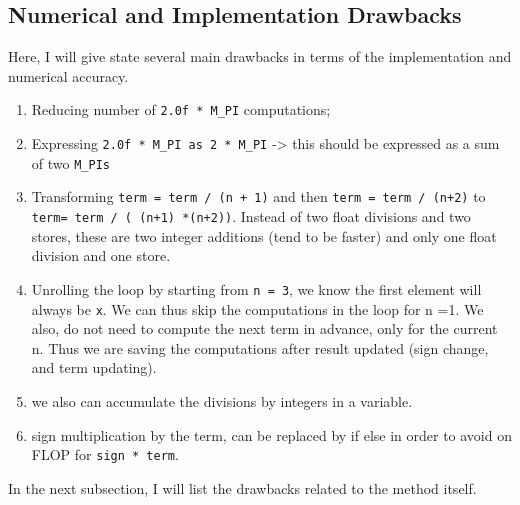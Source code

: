 \documentclass[12pt]{article}
\begin{document}


\subsection{Numerical and Implementation Drawbacks}
Here, I will give state several main drawbacks in terms of the implementation and numerical accuracy.
\begin{enumerate}
    \item Reducing number of \texttt{2.0f * M\_PI} computations;
    \item Expressing \texttt{2.0f * M\_PI as 2 * M\_PI} -> this should be expressed as a sum of two \texttt{M\_PIs}
    \item Transforming \texttt{term = term / (n + 1)} and then \texttt{term = term / (n+2)} to \texttt{term= term / ( (n+1) *(n+2))}. Instead of two float divisions and two stores, these are two integer additions (tend to be faster) and only one float division and one store.
    \item Unrolling the loop by starting from \texttt{n = 3}, we know the first element will always be \texttt{x}. We can thus skip the computations in the loop for n =1. We also, do not need to compute the next term in advance, only for the current n. Thus we are saving the computations after result updated (sign change, and term updating).
    \item we also can accumulate the divisions by integers in a variable.
    \item  sign multiplication by the term, can be replaced by if else in order to avoid on FLOP for \texttt{sign * term}.
\end{enumerate}

In the next subsection, I will list the drawbacks related to the method itself.
\end{document}
